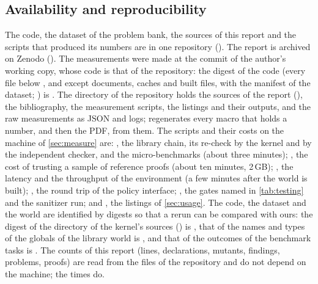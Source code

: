 \subsection*{Availability and reproducibility}\label{sec:availability}

The code, the dataset of the problem bank, the sources of this report and the scripts that produced its numbers are in one repository (\reporturl).
The report is archived on Zenodo (\reportdoi).
The measurements were made at the commit \mCommit{} of the author's working copy, whose code is that of the repository: the digest of the code (every file below ,  and  except documents, caches and built files, with the manifest of the dataset; ) is \code{\codeDigest}.
The directory  of the repository holds the sources of the report (), the bibliography, the measurement scripts, the listings and their outputs, and the raw measurements as JSON and logs;  regenerates every macro that holds a number, and then the PDF, from them.
The scripts and their costs on the machine of \cref{sec:measure} are: , the library chain, its re-check by the kernel and by the independent checker, and the micro-benchmarks (about three minutes); , the cost of trusting a sample of reference proofs (about ten minutes, 2\,GB); , the latency and the throughput of the environment (a few minutes after the world is built); , the round trip of the policy interface; , the gates named in \cref{tab:testing} and the sanitizer run; and , the listings of \cref{sec:usage}.
The code, the dataset and the world are identified by digests so that a rerun can be compared with ours: the digest of the directory of the kernel's sources () is , that of the names and types of the \libGlobals{} globals of the library world is \code{\worldDigestShort\ldots}, and that of the outcomes of the benchmark tasks is \code{\detDigest}.
The counts of this report (lines, declarations, mutants, findings, problems, proofs) are read from the files of the repository and do not depend on the machine; the times do.

